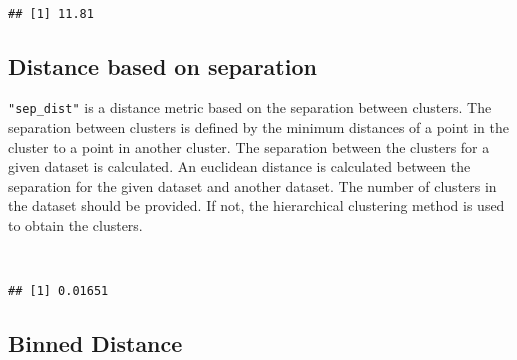 \begin{Shaded}
\begin{Highlighting}[]
\NormalTok{(}\NormalTok{(} \\
\NormalTok{(}\NormalTok{(}
\end{Highlighting}
\end{Shaded}

\begin{verbatim}
## [1] 11.81
\end{verbatim}

\subsection{Distance based on
separation}\label{distance-based-on-separation}

\texttt{"sep\_dist"} is a distance metric based on the separation
between clusters. The separation between clusters is defined by the
minimum distances of a point in the cluster to a point in another
cluster. The separation between the clusters for a given dataset is
calculated. An euclidean distance is calculated between the separation
for the given dataset and another dataset. The number of clusters in the
dataset should be provided. If not, the hierarchical clustering method
is used to obtain the clusters.

\begin{Shaded}
\begin{Highlighting}[]
\NormalTok{(}\NormalTok{(}\\
\NormalTok{(}\NormalTok{(} \NormalTok{))}
\end{Highlighting}
\end{Shaded}

\begin{verbatim}
## [1] 0.01651
\end{verbatim}

\subsection{Binned Distance}\label{binned-distance}

